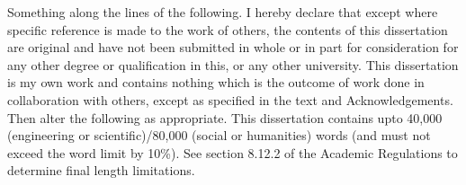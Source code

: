 
\begin{declaration}

Something along the lines of the following. I hereby declare that except where specific reference is made to the work of others, the contents of this dissertation are original and have not been submitted in whole or in part for consideration for any other degree or qualification in this, or any other university. This dissertation is my own work and contains nothing which is the outcome of work done in collaboration with others, except as specified in the text and Acknowledgements. Then alter the following as appropriate. This dissertation contains upto 40,000 (engineering or scientific)/80,000 (social or humanities) words (and must not exceed the word limit by 10\%). See section 8.12.2 of the Academic Regulations to determine final length limitations.


\end{declaration}


